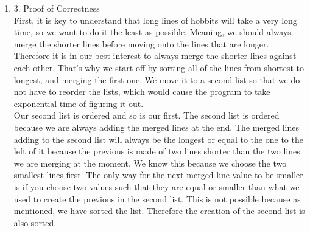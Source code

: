 \documentclass[11pt]{article}
\newenvironment{qparts}{\begin{enumerate}[{(}a{)}]}{\end{enumerate}}
\begin{document}
\begin{qparts}
\begin{verbatim}
  while true:
    if isEmpty(Lines) or isEmpty(L2): 
      if size(Lines) = 1:
        return Lines.pop() // returns & removes the first value in list
      else if size(L2) = 1: 
        return L2.pop()
      else if isEmpty(Lines):
        L = L2.pop() + L2.pop() // assume + sign merges the lines
        Lines.push(L)
          // push(L) puts L at the end of the list
        state := Lines
      else:
        L = Lines.pop() + Lines.pop()
        L2.push(L)
        state := L2
    else:
      V1, V2 = first two values in Lines, if possible --
        if not, return infinity. Does not remove from Lines
      V3, V4, first two values in L2, if possible --
        if not, return infinity. Does not remove from L2
      S1, S2 = two shortest lines from {V1, V2, V3, V4} 
      remove S1 from appropriate list
      remove S2 from appropriate list
      state.push(S1 + S2)
\end{verbatim}
\item[3.] Proof of Correctness \\
First, it is key to understand that long lines of hobbits will take a very long time, so we want to do it the least as possible. Meaning, we should always merge the shorter lines before moving onto the lines that are longer. Therefore it is in our best interest to always merge the shorter lines against each other. That's why we start off by sorting all of the lines from shortest to longest, and merging the first one. We move it to a second list so that we do not have to reorder the lists, which would cause the program to take exponential time of figuring it out. \\

Our second list is ordered and so is our first. The second list is ordered because we are always adding the merged lines at the end. The merged lines adding to the second list will always be the longest or equal to the one to the left of it because the previous is made of two lines shorter than the two lines we are merging at the moment. We know this because we choose the two smallest lines first. The only way for the next merged line value to be smaller is if you choose two values such that they are equal or smaller than what we used to create the previous in the second list. This is not possible because as mentioned, we have sorted the list. Therefore the creation of the second list is also sorted. \\


\end{qparts}
\end{document}
